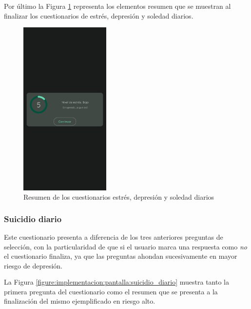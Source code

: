                 Por último la Figura \ref{figure:implementacion:pantalla:diarios_resumen} representa los elementos resumen que se muestran al finalizar los cuestionarios de estrés, depresión y soledad diarios.

                \begin{figure}[h]
                	\centering
                	\includegraphics[width=0.4\textwidth]{figures/pantallas/Resumen cuestionario.png}
                	\caption{Resumen de los cuestionarios estrés, depresión y soledad diarios}
                	\label{figure:implementacion:pantalla:diarios_resumen}
                \end{figure}

                \clearpage  %
            \subsubsection*{Suicidio diario}
                Este cuestionario presenta a diferencia de los tres anteriores preguntas de selección, con la particularidad de que si el usuario marca una respuesta como \textit{no} el cuestionario finaliza, ya que las preguntas ahondan sucesivamente en mayor riesgo de depresión.
                
                La Figura \ref{figure:implementacion:pantalla:suicidio_diario} muestra tanto la primera pregunta del cuestionario como el resumen que se presenta a la finalización del mismo ejemplificado en riesgo alto.

